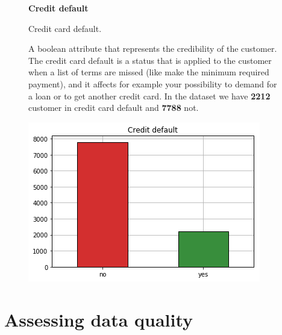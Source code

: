 \begin{figure}[ht]
  \begin{minipage}[h]{.50\textwidth}
        {\Large \textbf{Credit default}}
        
        Credit card default.
        
        A boolean attribute that represents the credibility of the customer.
        The credit card default is a status that is applied to the customer when a list of terms are missed (like make the minimum required payment), and it affects for example your possibility to demand for a loan or to get another credit card. In the dataset we have \textbf{2212} customer in credit card default and \textbf{7788} not. 
        
  \end{minipage}
  \begin{minipage}[h]{.50\textwidth}
    \includegraphics[width=.95\textwidth]{img/ch2/credit_default}
  \end{minipage}
\end{figure}

\clearpage

\section{Assessing data quality}

